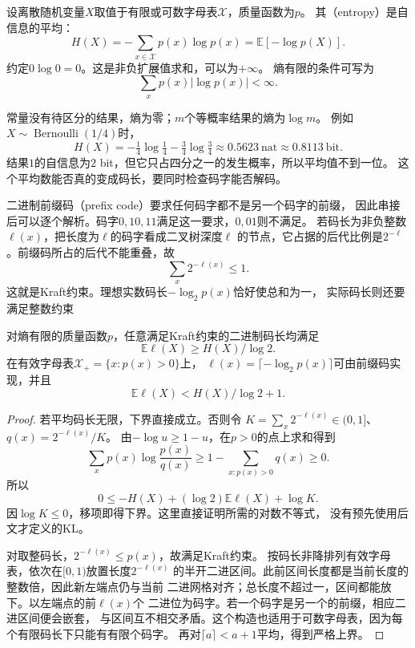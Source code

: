 \begin{definition}[离散熵]
\label{def:information-discrete-entropy}
设离散随机变量\(X\)取值于有限或可数字母表\(\mathcal X\)，质量函数为\(p\)。
其（entropy）是自信息的平均：
\begin{equation}
  H(X)=-\sum_{x\in\mathcal X}p(x)\log p(x)
      =\mathbb E[-\log p(X)].
  \label{eq:information-discrete-entropy}
\end{equation}
约定\(0\log0=0\)。这是非负扩展值求和，可以为\(+\infty\)。
熵有限的条件可写为
\[
  \sum_xp(x)|\log p(x)|<\infty.
\]
\end{definition}

常量没有待区分的结果，熵为零；\(m\)个等概率结果的熵为\(\log m\)。
例如\(X\sim\operatorname{Bernoulli}(1/4)\)时，
\[
  H(X)=-\tfrac14\log\tfrac14-\tfrac34\log\tfrac34
       \approx0.5623\ \mathrm{nat}\approx0.8113\ \mathrm{bit}.
\]
结果\(1\)的自信息为\(2\) bit，但它只占四分之一的发生概率，所以平均值不到一位。
这个平均数能否真的变成码长，要同时检查码字能否解码。

二进制前缀码（prefix code）要求任何码字都不是另一个码字的前缀，
因此串接后可以逐个解析。码字\(0,10,11\)满足这一要求，\(0,01\)则不满足。
若码长为非负整数\(\ell(x)\)，把长度为\(\ell\)的码字看成二叉树深度\(\ell\)
的节点，它占据的后代比例是\(2^{-\ell}\)。前缀码所占的后代不能重叠，故
\[
  \sum_x2^{-\ell(x)}\leq1.
\]
这就是Kraft约束。理想实数码长\(-\log_2p(x)\)恰好使总和为一，
实际码长则还要满足整数约束

\begin{theorem}[无失真前缀码的平均长度界]
\label{thm:information-source-coding-bound}
对熵有限的质量函数\(p\)，任意满足Kraft约束的二进制码长均满足
\[
  \mathbb E\ell(X)\geq H(X)/\log2.
\]
在有效字母表\(\mathcal X_+=\{x:p(x)>0\}\)上，
\(\ell(x)=\lceil-\log_2p(x)\rceil\)可由前缀码实现，并且
\[
  \mathbb E\ell(X)<H(X)/\log2+1.
\]
\end{theorem}
\begin{proof}
若平均码长无限，下界直接成立。否则令
\(K=\sum_x2^{-\ell(x)}\in(0,1]\)、\(q(x)=2^{-\ell(x)}/K\)。
由\(-\log u\geq1-u\)，在\(p>0\)的点上求和得到
\[
  \sum_xp(x)\log\frac{p(x)}{q(x)}
  \geq1-\sum_{x:p(x)>0}q(x)\geq0.
\]
所以
\[
  0\leq-H(X)+(\log2)\mathbb E\ell(X)+\log K.
\]
因\(\log K\leq0\)，移项即得下界。这里直接证明所需的对数不等式，
没有预先使用后文才定义的KL。

对取整码长，\(2^{-\ell(x)}\leq p(x)\)，故满足Kraft约束。
按码长非降排列有效字母表，依次在\([0,1)\)放置长度\(2^{-\ell(x)}\)
的半开二进区间。此前区间长度都是当前长度的整数倍，因此新左端点仍与当前
二进网格对齐；总长度不超过一，区间都能放下。以左端点的前\(\ell(x)\)个
二进位为码字。若一个码字是另一个的前缀，相应二进区间便会嵌套，
与区间互不相交矛盾。这个构造也适用于可数字母表，因为每个有限码长下只能有有限个码字。
再对\(\lceil a\rceil<a+1\)平均，得到严格上界。
\end{proof}


